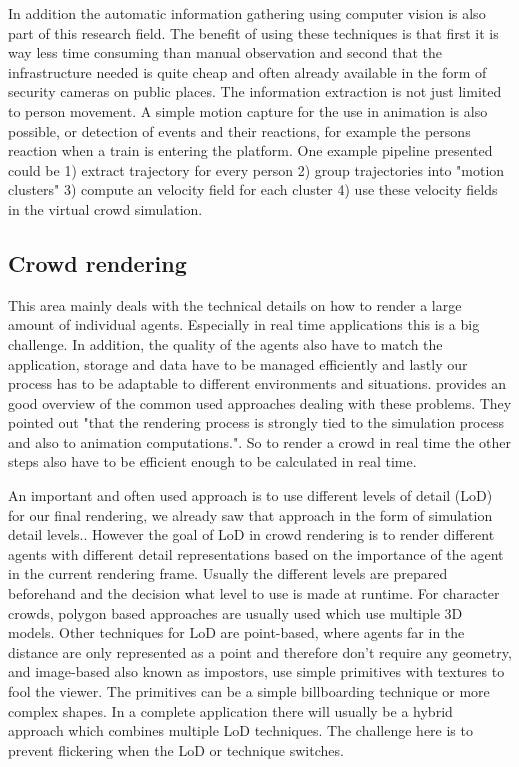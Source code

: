 \documentclass{acmsiggraph}               %
\begin{document}
In addition the automatic information gathering using computer vision is also part of this research field. The benefit of using these techniques is that first it is way less time consuming than manual observation and second that the infrastructure needed is quite cheap and often already available in the form of security cameras on public places. The information extraction is not just limited to person movement. A simple motion capture for the use in animation is also possible, or detection of events and their reactions, for example the persons reaction when a train is entering the platform. One example pipeline \cite{thalmann_crowd_2013} presented could be 1) extract trajectory for every person 2) group trajectories into "motion clusters" 3) compute an velocity field for each cluster 4) use these velocity fields in the virtual crowd simulation. 

\cite{thalmann_crowd_2013}

\subsection{Crowd rendering}

This area mainly deals with the technical details on how to render a large amount of individual agents. Especially in real time applications this is a big challenge. In addition, the quality of the agents also have to match the application, storage and data have to be managed efficiently and lastly our process has to be adaptable to different environments and situations. 
\cite{beacco_survey_2016} provides an good overview of the common used approaches dealing with these problems. They pointed out "that the rendering process is strongly tied to the simulation process and also to animation computations.". So to render a crowd in real time the other steps also have to be efficient enough to be calculated in real time.  

An important and often used approach is to use different levels of detail (LoD) for our final rendering, we already saw that approach in the form of simulation detail levels.\cite{osullivan_levels_2002}. However the goal of LoD in crowd rendering is to render different agents with different detail representations based on the importance of the agent in the current rendering frame. Usually the different levels are prepared beforehand and the decision what level to use is made at runtime. For character crowds, polygon based approaches are usually used which use multiple 3D models. Other techniques for LoD are point-based, where agents far in the distance are only represented as a point and therefore don't require any geometry, and image-based also known as impostors, use simple primitives with textures to fool the viewer. The primitives can be a simple billboarding technique or more complex shapes. In a complete application there will usually be a hybrid approach which combines multiple LoD techniques. The challenge here is to prevent flickering when the LoD or technique switches. 
\end{document}
